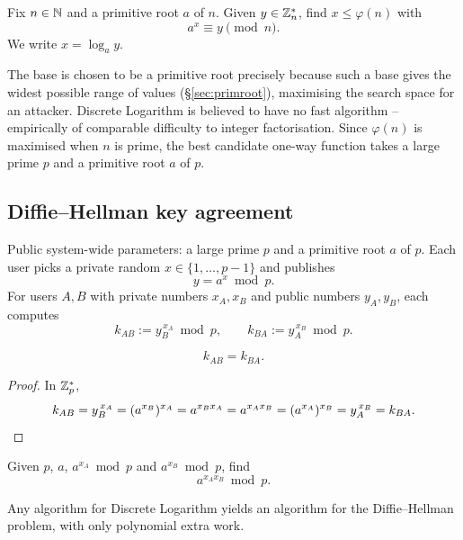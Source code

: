 \documentclass[11pt]{article}
\begin{document}
\begin{definition}
Fix $n\in\mathbb{N}$ and a primitive root $a$ of $n$. Given $y\in\mathbb{Z}_n^*$, find $x\le\varphi(n)$ with
\[
a^x\equiv y\pmod n.
\]
We write $x=\log_a y$.
\end{definition}

\begin{note}
The base is chosen to be a primitive root precisely because such a base gives the widest possible range of values (\S\ref{sec:primroot}), maximising the search space for an attacker. Discrete Logarithm is believed to have no fast algorithm -- empirically of comparable difficulty to integer factorisation. Since $\varphi(n)$ is maximised when $n$ is prime, the best candidate one-way function takes a large prime $p$ and a primitive root $a$ of $p$.
\end{note}

\subsection{Diffie--Hellman key agreement}
\label{sec:diffiehellman}

\begin{definition}
Public system-wide parameters: a large prime $p$ and a primitive root $a$ of $p$. Each user picks a private random $x\in\{1,\dots,p-1\}$ and publishes
\[
y=a^x\bmod p.
\]
For users $A,B$ with private numbers $x_A,x_B$ and public numbers $y_A,y_B$, each computes
\[
k_{AB} := y_B^{\,x_A}\bmod p, \qquad k_{BA} := y_A^{\,x_B}\bmod p.
\]
\end{definition}

\begin{theorem}[Agreement]
\label{thm:dhagree}
\[
k_{AB}=k_{BA}.
\]
\end{theorem}

\begin{proof}
In $\mathbb{Z}_p^*$,
\[
k_{AB}=y_B^{\,x_A}=(a^{x_B})^{x_A}=a^{x_Bx_A}=a^{x_Ax_B}=(a^{x_A})^{x_B}=y_A^{\,x_B}=k_{BA}. \qedhere
\]
\end{proof}

\begin{definition}
Given $p$, $a$, $a^{x_A}\bmod p$ and $a^{x_B}\bmod p$, find
\[
a^{x_Ax_B}\bmod p.
\]
\end{definition}

\begin{theorem}
\label{thm:dhreduce}
Any algorithm for Discrete Logarithm yields an algorithm for the Diffie--Hellman problem, with only polynomial extra work.
\end{theorem}
\end{document}
